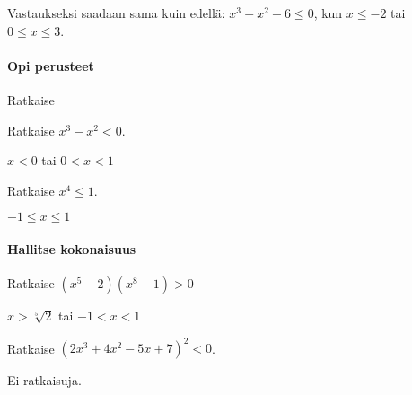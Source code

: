 Vastaukseksi saadaan sama kuin edellä: $x^3-x^2-6 \leq 0$, kun $x\leq -2$ tai $0\leq x \leq 3$.

\begin{tehtavasivu}

\paragraph*{Opi perusteet}

\begin{tehtava}
    Ratkaise
    \begin{alakohdat}
    \end{alakohdat}
    \begin{vastaus}
        \begin{alakohdat}
        \end{alakohdat}
    \end{vastaus}
\end{tehtava}

\begin{tehtava}
    Ratkaise $x^3-x^2<0$.
    \begin{vastaus}
        $x<0$ tai $0<x<1$
    \end{vastaus}
\end{tehtava}

\begin{tehtava}
    Ratkaise $x^4 \le 1$.
    \begin{vastaus}
        $-1 \le x \le 1$
    \end{vastaus}
\end{tehtava}

\paragraph*{Hallitse kokonaisuus}

\begin{tehtava}
Ratkaise $(x^5-2)(x^8-1) >0$
\begin{vastaus}
$x > \sqrt[5]{2}$ tai $-1<x<1$
\end{vastaus}
\end{tehtava}

\begin{tehtava}
    Ratkaise $(2x^3+4x^2-5x+7)^2 < 0$.
    \begin{vastaus}
        Ei ratkaisuja.
    \end{vastaus}
\end{tehtava}


\end{tehtavasivu}

